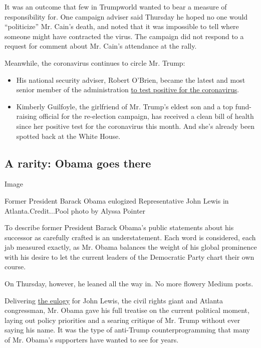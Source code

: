 It was an outcome that few in Trumpworld wanted to bear a measure of
responsibility for. One campaign adviser said Thursday he hoped no one
would ``politicize'' Mr. Cain's death, and noted that it was impossible
to tell where someone might have contracted the virus. The campaign did
not respond to a request for comment about Mr. Cain's attendance at the
rally.

Meanwhile, the coronavirus continues to circle Mr. Trump:

\begin{itemize}
\item
  His national security adviser, Robert O'Brien, became the latest and
  most senior member of the administration
  \href{https://www.nytimes.com/2020/07/27/us/politics/robert-obrien-virus.html}{to
  test positive for the coronavirus}.
\item
  Kimberly Guilfoyle, the girlfriend of Mr. Trump's eldest son and a top
  fund-raising official for the re-election campaign, has received a
  clean bill of health since her positive test for the coronavirus this
  month. And she's already been spotted back at the White House.
\end{itemize}

\hypertarget{a-rarity-obama-goes-there}{%
\subsection{A rarity: Obama goes
there}\label{a-rarity-obama-goes-there}}

Image

Former President Barack Obama eulogized Representative John Lewis in
Atlanta.Credit...Pool photo by Alyssa Pointer

To describe former President Barack Obama's public statements about his
successor as carefully crafted is an understatement. Each word is
considered, each jab measured exactly, as Mr. Obama balances the weight
of his global prominence with his desire to let the current leaders of
the Democratic Party chart their own course.

On Thursday, however, he leaned all the way in. No more flowery Medium
posts.

Delivering
\href{https://www.nytimes.com/2020/07/30/us/obama-eulogy-john-lewis-full-transcript.html}{the
eulogy} for John Lewis, the civil rights giant and Atlanta congressman,
Mr. Obama gave his full treatise on the current political moment, laying
out policy priorities and a searing critique of Mr. Trump without ever
saying his name. It was the type of anti-Trump counterprogramming that
many of Mr. Obama's supporters have wanted to see for years.

